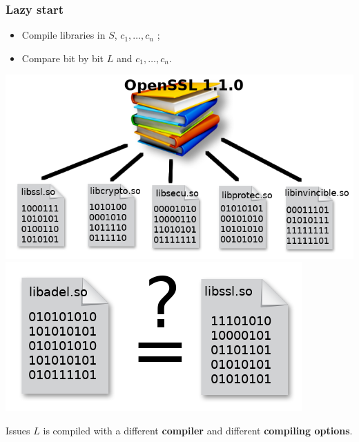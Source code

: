 \documentclass[11pt]{beamer}
\begin{document}
\begin{frame}
    \frametitle{Lazy start}

    
    \begin{block}{}
        \begin{itemize}
            \item Compile libraries in $S$, $c_1, \dots, c_n$ ; 
            \item Compare bit by bit $L$ and $c_1, \dots, c_n$.
        \end{itemize}
    \end{block}
    \begin{center}
    \includegraphics[scale=0.2]{compillib.png}
        \hspace{5em}
    \includegraphics[scale=0.2]{compbin.png}
    \end{center}
    \begin{block}{Issues}
        $L$ is compiled with a different \textbf{compiler} and different \textbf{compiling options}.
    \end{block}

\end{frame}
\end{document}
